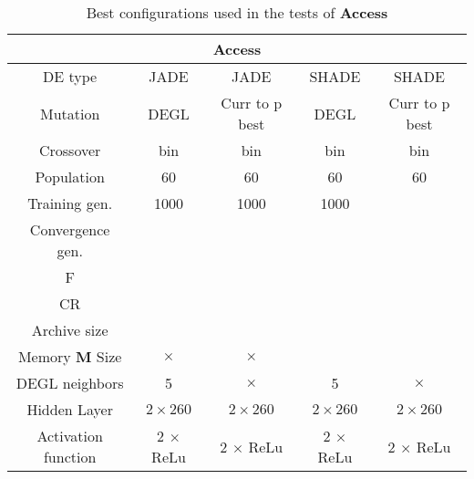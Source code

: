 \begin{table}[]
	\centering
	\begin{tabular}{|c|c|c|c|c|}
		\hline
		\multicolumn{5}{|c|}{\textbf{Access}} \\ \hline
		DE type & JADE & JADE & SHADE & SHADE \\ \hline
		Mutation & DEGL & Curr to p best & DEGL & Curr to p best  \\ \hline
		Crossover & bin & bin & bin & bin \\ \hline
		Population & 60 & 60 & 60 & 60 \\ \hline
		Training gen. & 1000 & 1000 & 1000 & \\ \hline
		Convergence gen. & & & & \\ \hline
		F & & & & \\ \hline
		CR & & & & \\ \hline
		Archive size & & & & \\ \hline
		Memory \textbf{M} Size & $\times$ & $\times$ & & \\ \hline
		DEGL neighbors & 5 & $\times$ & 5 & $\times$ \\ \hline
		Hidden Layer & $2 \times 260$ & $2 \times 260$ & $2 \times 260$ &  $2 \times 260$\\ \hline
		Activation function & 2 $\times$ ReLu & 2 $\times$ ReLu & 2 $\times$ ReLu & 2 $\times$ ReLu \\ \hline
	\end{tabular}
	\caption{Best configurations used in the tests of \textbf{Access}}
	\label{tbl:tests-configurations-access}
\end{table}

